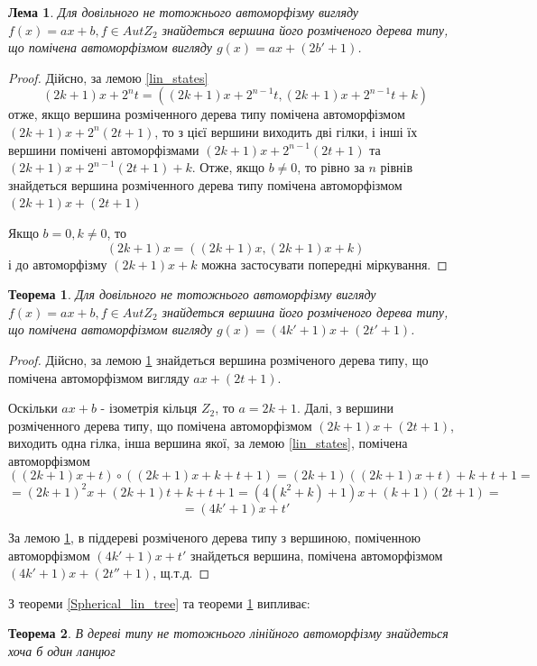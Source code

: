 \documentclass[a4paper,12pt]{article} \usepackage{a4wide}
\numberwithin{equation}{subsection}
\newtheorem{theorem}{Теорема}[subsection]
\newtheorem{lemma}{Лема}[subsection]
\begin{document}
\begin{lemma}\label{exist_ax_2b_1}
  Для довільного не тотожнього автоморфізму вигляду $f(x) = ax+b, f
  \in AutZ_2$ знайдеться вершина його розміченого дерева типу, що
  помічена автоморфізмом вигляду $g(x) = ax+(2b'+1)$.
\end{lemma}
\begin{proof}
  Дійсно, за лемою \ref{lin_states}
$$(2k+1)x+2^nt = ((2k+1)x+2^{n-1}t,(2k+1)x+2^{n-1}t+k) $$ отже, якщо вершина розміченного дерева типу помічена автоморфізмом $(2k+1)x+2^n(2t+1)$, то з цієї вершини виходить дві гілки, і інші їх вершини помічені автоморфізмами $(2k+1)x+2^{n-1}(2t+1)$ та $ (2k+1)x+2^{n-1}(2t+1)+k $. Отже, якщо $b\neq 0$, то рівно за $n$ рівнів знайдеться вершина розміченного дерева типу помічена автоморфізмом $(2k+1)x+(2t+1)$

Якщо $b= 0, k\neq 0$, то $$(2k+1)x = ((2k+1)x,(2k+1)x+k ) $$ і до
автоморфізму $(2k+1)x+k $ можна застосувати попередні міркування.
\end{proof}



\begin{theorem}\label{exist_4k_1}
  Для довільного не тотожнього автоморфізму вигляду $f(x) = ax+b, f
  \in AutZ_2$ знайдеться вершина його розміченого дерева типу, що
  помічена автоморфізмом вигляду $g(x) = (4k'+1)x+(2t'+1)$.
\end{theorem}
\begin{proof}
  Дійсно, за лемою \ref{exist_ax_2b_1} знайдеться вершина розміченого
  дерева типу, що помічена автоморфізмом вигляду $ax+(2t+1)$.


  Оскільки $ax+b$ - ізометрія кільця $Z_2$, то $a = 2k+1$. Далі, з
  вершини розміченного дерева типу, що помічена автоморфізмом
  $(2k+1)x+(2t+1)$, виходить одна гілка, інша вершина якої, за лемою
  \ref{lin_states}, помічена автоморфізмом
 $$((2k+1)x+t)\circ ((2k+1)x+k+t+1)= (2k+1)((2k+1)x+t)+k+t+1 =$$ 
$$= (2k+1)^2x + (2k+1)t+k+t+1 = (4(k^2+k)+1)x + (k+1)(2t+1) =$$ $$= (4k'+1)x+t' $$ 

За лемою \ref{exist_ax_2b_1}, в піддереві розміченого дерева типу з
вершиною, поміченною автоморфізмом $ (4k'+1)x+t' $ знайдеться вершина,
помічена автоморфізмом $ (4k'+1)x+(2t''+1) $, щ.т.д.
\end{proof}

З теореми \ref{Spherical_lin_tree} та теореми \ref{exist_4k_1}
випливає:
\begin{theorem}\label{chain_inside}
  В дереві типу не тотожнього лінійного автоморфізму знайдеться хоча б
  один ланцюг
\end{theorem}
\end{document}
